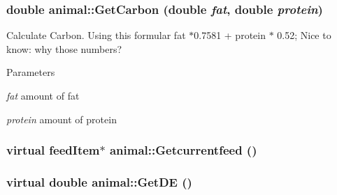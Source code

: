 \label{classanimal_a231533408e9e70e7278b7f3c352939a1}
\hypertarget{classanimal_a03c49c3eccec4f4eec1275bd707595ab}{
\subsubsection[{GetCarbon}]{\setlength{\rightskip}{0pt plus 5cm}double animal::GetCarbon (double {\em fat}, \/  double {\em protein})}}
\label{classanimal_a03c49c3eccec4f4eec1275bd707595ab}
Calculate Carbon. Using this formular fat $\ast$0.7581 + protein $\ast$ 0.52; Nice to know: why those numbers? 
\begin{DoxyParams}{Parameters}
\item[{\em fat}]amount of fat \item[{\em protein}]amount of protein \end{DoxyParams}
\hypertarget{classanimal_a9b3e9394438db452b3c1dcbd94419a9b}{
\subsubsection[{Getcurrentfeed}]{\setlength{\rightskip}{0pt plus 5cm}virtual {\bf feedItem}$\ast$ animal::Getcurrentfeed ()}}
\label{classanimal_a9b3e9394438db452b3c1dcbd94419a9b}
\hypertarget{classanimal_aef7118b0c94cb1bc05aa8783d80e10f0}{
\subsubsection[{GetDE}]{\setlength{\rightskip}{0pt plus 5cm}virtual double animal::GetDE ()}}
\label{classanimal_aef7118b0c94cb1bc05aa8783d80e10f0}


